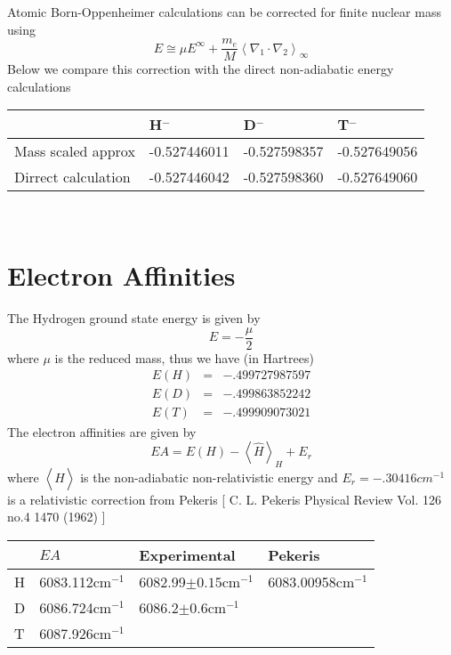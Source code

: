 \documentclass[12pt]{article}
\begin{document}
Atomic Born-Oppenheimer calculations can be corrected for finite nuclear
mass using 
\[
E\cong \mu E^\infty +\frac{m_e}M\left\langle \nabla _1\cdot \nabla
_2\right\rangle _\infty 
\]
Below we compare this correction with the direct non-adiabatic energy
calculations

\begin{tabular}{llll}
\hline\hline
& H$^{-}$ & D$^{-}$ & T$^{-}$ \\ \hline
Mass scaled approx & -0.527446011 & -0.527598357 & -0.527649056 \\ 
Dirrect calculation & -0.527446042 & -0.527598360 & -0.527649060 \\ 
\hline\hline
\end{tabular}

\newpage\ 

\section{Electron Affinities}

\newpage

The Hydrogen ground state energy is given by
\[
E=-\frac \mu 2
\]
where $\mu $ is the reduced mass, thus we have (in Hartrees)
\begin{eqnarray*}
E\left( H\right)  &=&-.499727987597 \\
E\left( D\right)  &=&-.499863852242 \\
E\left( T\right)  &=&-.499909073021
\end{eqnarray*}
The electron affinities are given by
\[
EA=E\left( H\right) -\left\langle \widehat{H}\right\rangle _H+E_r
\]
where $\left\langle \widehat{H}\right\rangle $ is the non-adiabatic
non-relativistic energy and $E_r=-.30416cm^{-1}$ is a relativistic
correction from Pekeris [ C. L. Pekeris Physical Review Vol. 126 no.4 1470
(1962) ]

\begin{tabular}{llll}
\hline\hline
& $EA$ & Experimental & Pekeris \\ \hline
H & 6083.112cm$^{-1}$ & 6082.99$\pm 0.15$cm$^{-1}$ & 6083.00958cm$^{-1}$ \\ 
D & 6086.724cm$^{-1}$ & 6086.2$\pm 0.6$cm$^{-1}$ &  \\ 
T & 6087.926cm$^{-1}$ &  &  \\ \hline
\end{tabular}
\end{document}
